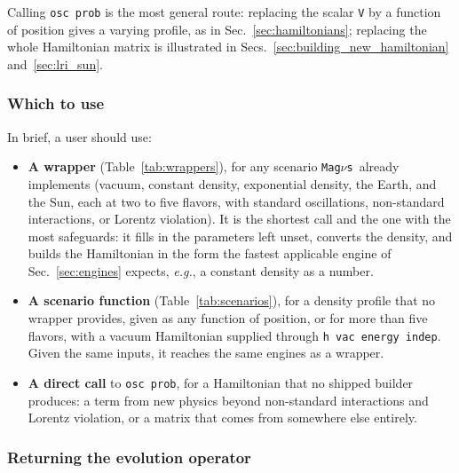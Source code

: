 \documentclass[final,5p,times,twocolumn,sort,compress]{elsarticle}
\makeatletter
\newcommand{\eg}{{\it e.g.}}
\DeclareRobustCommand{\_}{%
  \ifmmode\nfss@text{\textunderscore}\else\textunderscore\allowbreak\fi}
\newcommand{\Tab}{Table}
\newcommand{\tabl}[1]{\Tab~\ref{tab:#1}}
\newcommand{\magnus}{{\tt Mag}\ensuremath{\nu}{\tt s}}
\makeatother
\begin{document}
Calling {\tt osc\_prob} is the most general route: replacing the scalar {\tt V} by a function of position gives a varying profile, as in Sec.~\ref{sec:hamiltonians}; replacing the whole Hamiltonian matrix is illustrated in Secs.~\ref{sec:building_new_hamiltonian} and~\ref{sec:lri_sun}.


\subsubsection{Which to use}

In brief, a user should use:
\begin{itemize}
\item \textbf{A wrapper} (\tabl{wrappers}), for any scenario \magnus\ already implements (vacuum, constant density, exponential density, the Earth, and the Sun, each at two to five flavors, with standard oscillations, non-standard interactions, or Lorentz violation). It is the shortest call and the one with the most safeguards: it fills in the parameters left unset, converts the density, and builds the Hamiltonian in the form the fastest applicable engine of Sec.~\ref{sec:engines} expects, \eg, a constant density as a number.
\item \textbf{A scenario function} (\tabl{scenarios}), for a density profile that no wrapper provides, given as any function of position, or for more than five flavors, with a vacuum Hamiltonian supplied through {\tt h\_vac\_energy\_indep}. Given the same inputs, it reaches the same engines as a wrapper.
\item \textbf{A direct call} to {\tt osc\_prob}, for a Hamiltonian that no shipped builder produces: a term from new physics beyond non-standard interactions and Lorentz violation, or a matrix that comes from somewhere else entirely.
\end{itemize}


\subsubsection{Returning the evolution operator}
\label{sec:evolution_operator}
\end{document}
